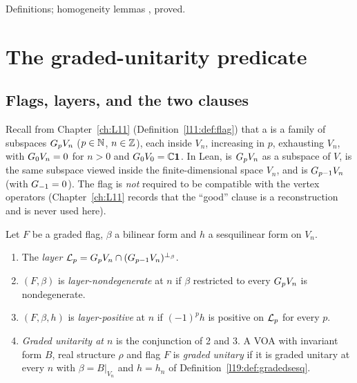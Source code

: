 \begin{status}
Definitions; homogeneity lemmas ,  proved.
\end{status}

\section{The graded-unitarity predicate}\label{l19:sec:gu}

\subsection{Flags, layers, and the two clauses}

Recall from Chapter~\ref{ch:L11} (Definition~\ref{l11:def:flag}) that a  is a family
of subspaces $G_pV_n$ ($p\in{\mathbb{N}}$, $n\in{\mathbb{Z}}$), each inside $V_n$, increasing in $p$, exhausting
$V_n$, with $G_0V_n = 0$ for $n>0$ and $G_0V_0 = {\mathbb{C}}\mathbf{1}$. In Lean,
 is $G_pV_n$ as a subspace of $V$,  is the same subspace
viewed inside the finite-dimensional space $V_n$, and  is
$G_{p-1}V_n$ (with $G_{-1} = 0$). The flag is \emph{not} required to be compatible
with the vertex operators (Chapter~\ref{ch:L11} records that the ``good'' clause
 is a reconstruction and is never used here).

\begin{definition}\label{l19:def:gu}
Let $F$ be a graded flag, $\beta$ a bilinear form and $h$ a sesquilinear form on $V_n$.
\begin{enumerate}
\item The \emph{layer} $\mathcal{L}_p = G_pV_n\cap(G_{p-1}V_n)^{\perp_\beta}$.
\item $(F,\beta)$ is \emph{layer-nondegenerate} at $n$ if $\beta$ restricted to every
  $G_pV_n$ is nondegenerate.
\item $(F,\beta,h)$ is \emph{layer-positive} at $n$ if $(-1)^ph$ is positive on $\mathcal{L}_p$ for
  every $p$.
\item \emph{Graded unitarity at $n$} is the conjunction of 2 and 3. A VOA with invariant form $B$, real
  structure $\rho$ and flag $F$ is \emph{graded unitary} if it is graded unitary at every $n$ with
  $\beta = B|_{V_n}$ and $h = h_n$ of Definition~\ref{l19:def:gradedsesq}.
\end{enumerate}
\end{definition}

